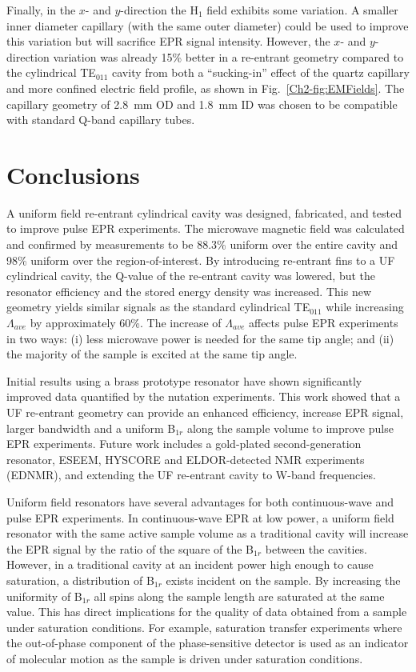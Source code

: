 Finally, in the $x$- and $y$-direction the H$_1$ field exhibits some variation. A smaller inner diameter capillary (with the same outer diameter) could be used to improve this variation but will sacrifice EPR signal intensity. However, the $x$- and $y$-direction variation was already 15\% better in a re-entrant geometry compared to the cylindrical TE$_{011}$ cavity from both a ``sucking-in'' effect of the quartz capillary and more confined electric field profile, as shown in Fig.~\ref{Ch2-fig:EMFields}. The capillary geometry of 2.8~mm OD and 1.8~mm ID was chosen to be compatible with standard Q-band capillary tubes. 

\section{Conclusions}
A uniform field re-entrant cylindrical \cylTE{} cavity was designed, fabricated, and tested to improve pulse EPR experiments. The microwave magnetic field was calculated and confirmed by measurements to be 88.3\% uniform over the entire cavity and 98\% uniform over the region-of-interest. By introducing re-entrant fins to a UF cylindrical \cylTE{} cavity, the Q-value of the re-entrant \cylTE{} cavity was lowered, but the resonator efficiency and the stored energy density was increased. This new geometry yields similar signals as the standard cylindrical TE$_{011}$ while increasing $\Lambda_{ave}$ by approximately 60\%. The increase of $\Lambda_{ave}$ affects pulse EPR experiments in two ways: (i) less microwave power is needed for the same tip angle; and (ii) the majority of the sample is excited at the same tip angle. 

Initial results using a brass prototype resonator have shown significantly improved data quantified by the nutation experiments. This work showed that a UF re-entrant geometry can provide an enhanced efficiency, increase EPR signal, larger bandwidth and a uniform B$_{1r}$ along the sample volume to improve pulse EPR experiments. Future work includes a gold-plated second-generation resonator, ESEEM, HYSCORE and ELDOR-detected NMR experiments (EDNMR), and extending the UF re-entrant \cylTE{} cavity to W-band frequencies.

Uniform field resonators have several advantages for both continuous-wave and pulse EPR experiments. In continuous-wave EPR at low power, a uniform field resonator with the same active sample volume as a traditional cavity will increase the EPR signal by the ratio of the square of the B$_{1r}$ between the cavities. However, in a traditional cavity at an incident power high enough to cause saturation, a distribution of B$_{1r}$ exists incident on the sample. By increasing the uniformity of B$_{1r}$ all spins along the sample length are saturated at the same value. This has direct implications for the quality of data obtained from a sample under saturation conditions. For example, saturation transfer experiments where the out-of-phase component of the phase-sensitive detector is used as an indicator of molecular motion as the sample is driven under saturation conditions. \cite{SaturationTransfer2005} 

